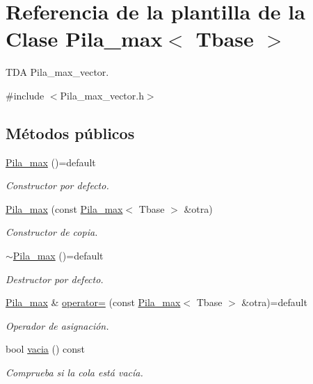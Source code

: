 \hypertarget{classPila__max}{}\section{Referencia de la plantilla de la Clase Pila\+\_\+max$<$ Tbase $>$}
\label{classPila__max}


T\+DA Pila\+\_\+max\+\_\+vector.  




{\ttfamily \#include $<$Pila\+\_\+max\+\_\+vector.\+h$>$}

\subsection*{Métodos públicos}
\begin{DoxyCompactItemize}
\item 
\hyperlink{classPila__max_a57b37a9e025685ae0c1ab172192dedb2}{Pila\+\_\+max} ()=default
\begin{DoxyCompactList}\small\item\em Constructor por defecto. \end{DoxyCompactList}\item 
\hyperlink{classPila__max_ab5710c39c42d4d089736bba758c54f69}{Pila\+\_\+max} (const \hyperlink{classPila__max}{Pila\+\_\+max}$<$ Tbase $>$ \&otra)
\begin{DoxyCompactList}\small\item\em Constructor de copia. \end{DoxyCompactList}\item 
\hyperlink{classPila__max_a84d64a0a0cece968a752cc5fb554b362}{$\sim$\+Pila\+\_\+max} ()=default
\begin{DoxyCompactList}\small\item\em Destructor por defecto. \end{DoxyCompactList}\item 
\hyperlink{classPila__max}{Pila\+\_\+max} \& \hyperlink{classPila__max_a9dd8b206b245be51149a2100a83529c7}{operator=} (const \hyperlink{classPila__max}{Pila\+\_\+max}$<$ Tbase $>$ \&otra)=default
\begin{DoxyCompactList}\small\item\em Operador de asignación. \end{DoxyCompactList}\item 
bool \hyperlink{classPila__max_aa61d11b7ee3e037dea632d185ca146a0}{vacia} () const
\begin{DoxyCompactList}\small\item\em Comprueba si la cola está vacía. \end{DoxyCompactList}\item 

\end{DoxyCompactItemize}
